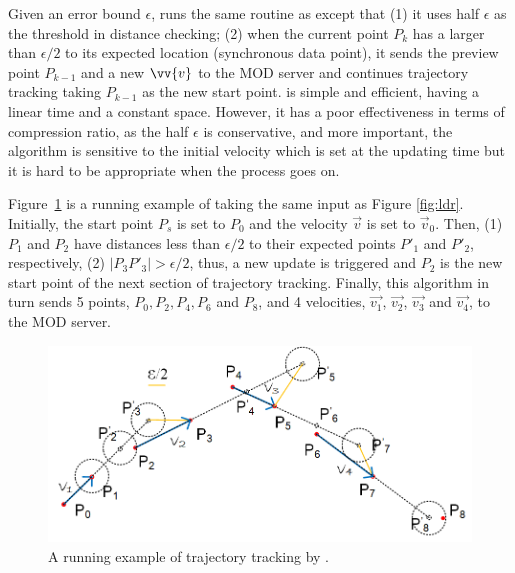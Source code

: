 Given an error bound $\epsilon$, \ldrh runs the same routine as \ldr except that (1) it uses half $\epsilon$ as the threshold in distance checking; (2) when the current point $P_k$ has a \sed larger than $\epsilon/2$ to its expected location (synchronous data point), it sends the preview point $P_{k-1}$ and a new $\vv{v}$ to the MOD server and continues trajectory tracking taking $P_{k-1}$ as the new start point. \ldrh is simple and efficient, having a linear time and a constant space. However, it has a poor effectiveness in terms of compression ratio, as the half $\epsilon$ is conservative, and more important, the algorithm is sensitive to the initial velocity which is set at the updating time but it is hard to be appropriate when the process goes on.

\begin{example}
Figure~\ref{fig:ldrh} is a running example of \ldrh taking the same input as Figure \ref{fig:ldr}.
Initially, the start point $P_s$ is set to $P_0$ and the velocity $\vec{v}$ is set to $\vec{v}_0$. Then, (1) $P_1$ and $P_2$ have \sed distances less than $\epsilon/2$ to their expected points $P'_1$ and $P'_2$, respectively, (2) $|P_3P'_3| > \epsilon/2$, thus, a new update is triggered and $P_2$ is the new start point of the next section of trajectory tracking. Finally, this algorithm in turn sends 5 points, $P_0, P_2, P_4, P_6$ and $P_8$, and 4 velocities, $\vec{v_1}$, $\vec{v_2}$, $\vec{v_3}$ and $\vec{v_4}$, to the MOD server.
\end{example}

\begin{figure}[tb!]
	\centering
	\includegraphics[scale=1.0]{figures/Fig-LDRH.png}
	\vspace{-1.5ex}
	\caption{\small A running example of trajectory tracking by \ldrh. }
	\vspace{-2ex}
	\label{fig:ldrh}
\end{figure}

